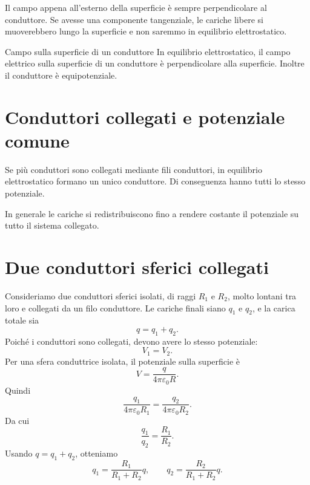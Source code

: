 \documentclass[a4paper]{article}
\begin{document}
Il campo appena all'esterno della superficie è sempre perpendicolare al conduttore. Se avesse una componente tangenziale, le cariche libere si muoverebbero lungo la superficie e non saremmo in equilibrio elettrostatico.

\begin{snippetproposition}{Campo sulla superficie di un conduttore}
    In equilibrio elettrostatico, il campo elettrico sulla superficie di un conduttore è perpendicolare alla superficie. Inoltre il conduttore è equipotenziale.
\end{snippetproposition}

\section{Conduttori collegati e potenziale comune}

Se più conduttori sono collegati mediante fili conduttori, in equilibrio elettrostatico formano un unico conduttore. Di conseguenza hanno tutti lo stesso potenziale.

\begin{center}
\end{center}

In generale le cariche si redistribuiscono fino a rendere costante il potenziale su tutto il sistema collegato.

\section{Due conduttori sferici collegati}

Consideriamo due conduttori sferici isolati, di raggi \(R_1\) e \(R_2\), molto lontani tra loro e collegati da un filo conduttore. Le cariche finali siano \(q_1\) e \(q_2\), e la carica totale sia
\[
    q=q_1+q_2.
\]
Poiché i conduttori sono collegati, devono avere lo stesso potenziale:
\[
    V_1=V_2.
\]
Per una sfera conduttrice isolata, il potenziale sulla superficie è
\[
    V=\frac{q}{4\pi\varepsilon_0R}.
\]
Quindi
\[
    \frac{q_1}{4\pi\varepsilon_0R_1}=\frac{q_2}{4\pi\varepsilon_0R_2}.
\]
Da cui
\[
    \frac{q_1}{q_2}=\frac{R_1}{R_2}.
\]
Usando \(q=q_1+q_2\), otteniamo
\[
    q_1=\frac{R_1}{R_1+R_2}q,
    \qquad
    q_2=\frac{R_2}{R_1+R_2}q.
\]
\end{document}
